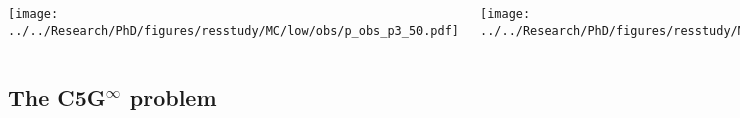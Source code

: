 \documentclass[compress,10pt]{beamer}
\begin{document}
\begin{frame}
\begin{columns}[t]
        \centering

        {}\texttt{[image: ../../Research/PhD/figures/resstudy/MC/low/obs/p\_obs\_p3\_50.pdf]}

        \centering

        {}\texttt{[image: ../../Research/PhD/figures/resstudy/MC/med/obs/p\_obs\_p3\_10.pdf]}

    \end{columns}

\end{frame}

\subsection{The C5G$^\infty$ problem}

\typeout{***********************************************************************************}
\end{document}

